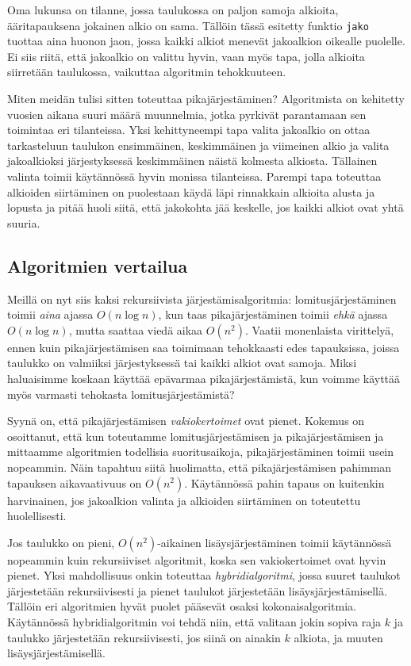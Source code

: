 Oma lukunsa on tilanne, jossa taulukossa on paljon samoja alkioita,
ääri\-tapauksena jokainen alkio on sama.
Tällöin tässä esitetty funktio \texttt{jako} tuottaa aina huonon jaon,
jossa kaikki alkiot menevät jakoalkion oikealle puolelle.
Ei siis riitä, että jakoalkio on valittu hyvin,
vaan myös tapa, jolla alkioita siirretään taulukossa,
vaikuttaa algoritmin tehokkuuteen.

Miten meidän tulisi sitten toteuttaa pikajärjestäminen?
Algoritmista on kehitetty vuosien aikana suuri määrä muunnelmia,
jotka pyrkivät parantamaan sen toimintaa eri tilanteissa.
Yksi kehittyneempi tapa valita jakoalkio on ottaa tarkasteluun
taulukon ensimmäinen, keskimmäinen ja viimeinen alkio ja valita
jakoalkioksi järjestyksessä keskimmäinen näistä kolmesta alkiosta.
Tällainen valinta toimii käytännössä hyvin monissa tilanteissa.
Parempi tapa toteuttaa alkioiden siirtäminen on puolestaan
käydä läpi rinnakkain alkioita alusta ja lopusta ja
pitää huoli siitä, että jakokohta jää keskelle, jos kaikki alkiot
ovat yhtä suuria.

\subsection{Algoritmien vertailua}

Meillä on nyt siis kaksi rekursiivista järjestämisalgoritmia:
lomitusjärjestä\-minen toimii \emph{aina} ajassa $O(n \log n)$,
kun taas pikajärjestäminen toimii \emph{ehkä} ajassa $O(n \log n)$,
mutta saattaa viedä aikaa $O(n^2)$.
Vaatii monenlaista virittelyä,
ennen kuin pikajärjestämisen saa toimimaan tehokkaasti
edes tapauksissa, joissa taulukko on valmiiksi järjestyksessä
tai kaikki alkiot ovat samoja.
Miksi haluaisimme koskaan käyttää epävarmaa pikajärjestämistä,
kun voimme käyttää myös varmasti tehokasta lomitusjärjestämistä?

Syynä on, että pikajärjestämisen \emph{vakiokertoimet} ovat pienet.
Kokemus on osoittanut, että kun toteutamme lomitusjärjestämisen ja
pikajärjestämisen ja mittaamme algoritmien todellisia suoritusaikoja,
pikajärjestäminen toimii usein nopeammin.
Näin tapahtuu siitä huolimatta, että pikajärjestämisen pahimman
tapauksen aikavaativuus on $O(n^2)$.
Käytännössä pahin tapaus on kuitenkin harvinainen,
jos jakoalkion valinta ja alkioiden siirtäminen on toteutettu huolellisesti.

Jos taulukko on pieni, $O(n^2)$-aikainen lisäysjärjestäminen
toimii käytän\-nössä nopeammin kuin rekursiiviset algoritmit,
koska sen vakiokertoimet ovat hyvin pienet.
Yksi mahdollisuus onkin toteuttaa \emph{hybridialgoritmi},
jossa suuret taulukot järjes\-tetään rekursiivisesti
ja pienet taulukot järjes\-tetään lisäysjärjestämisellä.
Tällöin eri algoritmien hyvät puolet pääsevät osaksi
kokonaisalgoritmia.
Käytännössä hybridialgoritmin voi tehdä niin,
että valitaan jokin sopiva raja $k$ ja
taulukko järjestetään rekursiivisesti,
jos siinä on ainakin $k$ alkiota, ja muuten lisäysjärjestämisellä.

